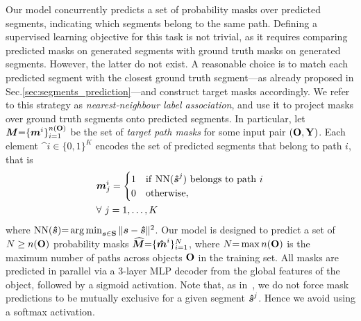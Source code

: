 Our model concurrently predicts a set of probability masks over predicted segments, indicating which segments belong to the same path. 
Defining a supervised learning objective for this task is not trivial, as it requires comparing predicted masks on generated segments with ground truth masks on generated segments. However, the latter do not exist.
%
A reasonable choice is to match each predicted segment with the closest ground truth segment---as already proposed in Sec.\ref{sec:segments_prediction}---and construct target masks accordingly.
We refer to this strategy as \emph{nearest-neighbour label association}, and use it to project masks over ground truth segments onto predicted segments.
In particular, let $\boldsymbol{M}{=}\{\boldsymbol{m}^i\}_{i=1}^{n(\mathbf{O})}$ be the set of \emph{target path masks} for some input pair $(\mathbf{O},\mathbf{Y})$.
Each element $\bm^i \in \{0,1\}^K$ encodes the set of predicted segments that belong to path $i$, that is
%
\begin{equation}
\begin{split}
    & \bm^{i}_{j} =\begin{cases}
1 & \mathrm{if\ } \mathrm{NN}(\bshat^j) \ \mathrm{belongs \ to \ path} \ i\\
0 & \mathrm{otherwise},
\end{cases} \\
& \forall \ j = 1, \dots, K
\end{split}
\end{equation}
where $\mathrm{NN}(\boldsymbol{\hat{s}}) {=} \operatorname*{arg\,min}_{\boldsymbol{s} \in \mathbf{S}} \| \boldsymbol{s}-\boldsymbol{\hat{s}} \|^2$. 
%
Our model is designed to predict a set of $N\geq n(\mathbf{O})$ probability masks $\boldsymbol{\widehat{M}}{=}\{ \boldsymbol{\hat{m}}^{i} \}_{i=1}^{N}$, where $N{=}\max n(\mathbf{O})$ is the maximum number of paths across objects $\mathbf{O}$ in the training set. 
All masks are predicted in parallel via a 3-layer MLP decoder from the global features of the object, followed by a sigmoid activation.
Note that, as in~\cite{cheng2021maskformer}, we do not force mask predictions to be mutually exclusive for a given segment $\boldsymbol{\hat{s}}^j$. Hence we avoid using a softmax activation.

